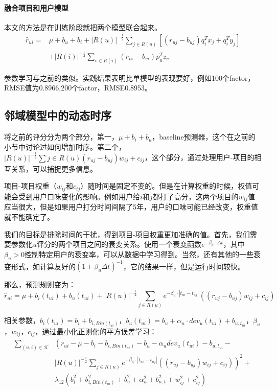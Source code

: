 \documentclass{article}
\begin{document}
\paragraph{融合项目和用户模型}
本文的方法是在训练阶段就把两个模型联合起来。
\[ 
\begin{array}{cl}
\hat{r}_{ui}= & \mu+b_u+b_i+|R(u)|^{-\frac{1}{2}}\mathop{\sum}\limits_{j\in R(u)}[(r_{uj}-b_{uj})q_i^Tx_j+q_i^Ty_j]\\
&  +|R(i)|^{-\frac{1}{2}}\mathop{\sum}\limits_{v\in R(i)}(r_{vi}-b_{vi})p_u^Tz_v 
\end{array}
\]

参数学习与之前的类似。实践结果表明比单模型的表现要好，例如100个factor，RMSE值为0.8966,200个factor，RMSE0.8953。

\subsection{邻域模型中的动态时序}
将之前的评分分为两个部分，第一，$\mu+b_i+b_u$，baseline预测器，这个在之前的小节中讨论过如何增加时序。第二个，$|R(u)|^{-\frac{1}{2}}\mathop{\sum}{j\in R(u)}(r_{uj}-b_{uj})w_{ij}+c_{ij}$，这个部分，通过处理用户-项目的相互关系，可以捕捉更多信息。

项目-项目权重（$w_{ij}$和$c_{ij}$）随时间是固定不变的。但是在计算权重的时候，权值可能会受到用户口味变化的影响。例如用户给$i$和$j$都打了高分，这两个项目的$w_{ij}$值应当很大，但是如果用户打分时间间隔了5年，用户的口味可能已经改变，权重值就不能确定了。

我们的目标是排除时间的干扰，得到项目-项目权重更加准确的值。首先，我们需要参数化$u$评分的两个项目之间的衰变关系。使用一个衰变函数$e^{-\beta_u\cdot\Delta t}$，其中$\beta_u>0$控制特定用户的衰变率，可以从数据中学习得到。当然，还有其他的一些衰变形式，如计算友好的$(1+\beta_u\Delta t)^{-1}$，它的结果一样，但是运行时间较快。

那么，预测规则变为：
$$ \hat{r}_{ui}=\mu+b_i(t_{ui})+b_u(t_{ui})+|R(u)|^{-\frac{1}{2}}\mathop{\sum}\limits_{j\in R(u)}e^{-\beta_u\cdot|t_{ui}-t_{uj}|}((r_{uj}-b_{uj})w_{ij}+c_{ij}) $$

相关参数，$b_i(t_{ui})=b_i+b_{i,Bin(t_{ui})}$，$b_u(t_{ui})=b_u+\alpha_u\cdot dev_u(t_{ui})+b_{u,t_{ui}}$，$\beta_u$，$w_{ij}$，$c_{ij}$，通过最小化正则化的平方误差学习：
\[ 
\begin{array}{cl}
\mathop{\sum}\limits_{(u,i)\in\mathcal{K}} & \left(r_{ui}-\mu-b_i-b_{i,Bin(t_{ui})}-b_u-\alpha_u dev_u(t_{ui})-b_{u,t_{ui}}-\right.\\
  & \left.|R(u)|^{-\frac{1}{2}}\mathop{\sum}\limits_{j\in R(u)}e^{-\beta_u\cdot|t_{ui}-t_{uj}|}((r_{uj}-b_{uj})w_{ij}+c_{ij})\right)^2+\\
  & \lambda_{12}\left(b_i^2+b_{i,Bin(t_{ui})}^2+b_u^2+\alpha_u^2+b_{u,t}^2+w_{ij}^2+c_{ij}^2\right)
\end{array}
\]
\end{document}
